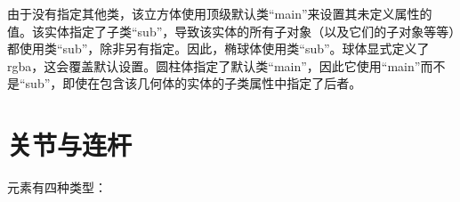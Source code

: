 由于没有指定其他类，该立方体使用顶级默认类“main”来设置其未定义属性的值。该实体指定了子类“sub”，导致该实体的所有子对象（以及它们的子对象等等）都使用类“sub”，除非另有指定。因此，椭球体使用类“sub”。球体显式定义了 rgba，这会覆盖默认设置。圆柱体指定了默认类“main”，因此它使用“main”而不是“sub”，即使在包含该几何体的实体的子类属性中指定了后者。

\section{关节与连杆}
元素有四种类型：

\bigstar 